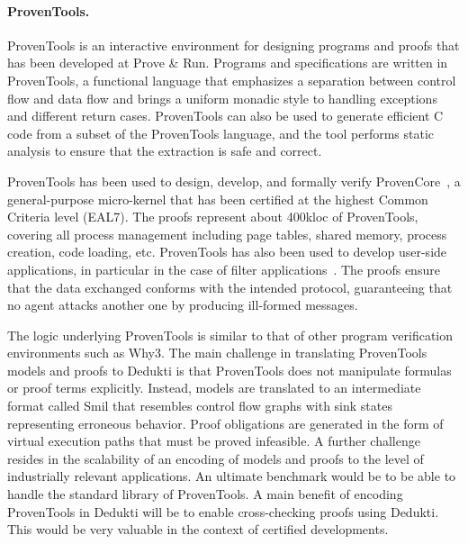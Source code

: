 \paragraph*{ProvenTools.}
ProvenTools is an interactive environment for designing programs and proofs that
has been developed at Prove \& Run. Programs and
specifications are written in ProvenTools, a functional language that
emphasizes a separation between control flow and data flow and brings a uniform
monadic style to handling exceptions and different return cases.
ProvenTools can also be used to generate efficient C code from a subset
of the ProvenTools language, and the tool performs static analysis to ensure
that the extraction is safe and correct.

ProvenTools has been used to design, develop, and formally verify
ProvenCore~\cite{lescuyer:provencore}, a general-purpose micro-kernel that has
been certified at the highest Common Criteria level (EAL7). The proofs represent
about 400kloc of ProvenTools, covering all process management including page
tables, shared memory, process creation, code loading, etc. ProvenTools has also
been used to develop user-side applications, in particular in the case of filter
applications~\cite{bolignano:security}. The proofs ensure that the data
exchanged conforms with the intended protocol, guaranteeing that no agent
attacks another one by producing ill-formed messages.

The logic underlying ProvenTools is similar to that of other program
verification environments such as Why3. The main challenge in translating
ProvenTools models and proofs to Dedukti is that ProvenTools does not
manipulate formulas or proof terms explicitly. Instead, models are translated to
an intermediate format called Smil that resembles control flow graphs
with sink states representing erroneous behavior. Proof obligations are
generated in the form of virtual execution paths that must be proved infeasible.
A further challenge resides in the scalability of an encoding of models and
proofs to the level of industrially relevant applications. An ultimate benchmark
would be to be able to handle the standard library of ProvenTools. A main
benefit of encoding ProvenTools in Dedukti will be to enable cross-checking
proofs using Dedukti. This would be very valuable in the context of certified
developments.

